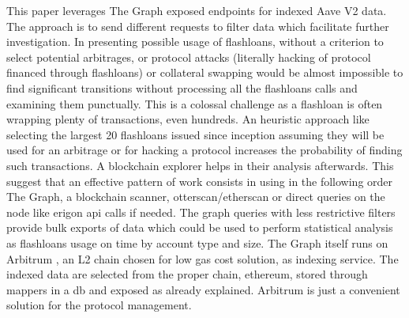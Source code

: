 \documentclass[11pt,a4paper,titlepage]{scrartcl}
\begin{document}
This paper leverages The Graph exposed endpoints for indexed Aave V2 data. The approach is to send different requests to filter data which facilitate further investigation. In presenting possible usage of flashloans, without a criterion to select potential arbitrages, or protocol attacks (literally hacking of protocol financed through flashloans) or collateral swapping would be almost impossible to find significant transitions without processing all the flashloans calls and examining them punctually. This is a colossal challenge as a flashloan is often wrapping plenty of transactions, even hundreds. An heuristic approach like selecting the largest 20 flashloans issued since inception assuming they will be used for an arbitrage or for hacking a protocol increases the probability of finding such transactions. A blockchain explorer helps in their analysis afterwards. This suggest  that an effective pattern of work consists in using in the following order The Graph, a blockchain scanner, otterscan/etherscan or direct queries on the node like erigon api calls if needed. The graph queries with less restrictive filters provide bulk exports of data which could be used to perform statistical analysis as flashloans usage on time by account type and size.
The Graph itself  runs on Arbitrum , an L2 chain chosen for low gas cost solution, as indexing service. The indexed data are selected from the proper chain, ethereum,  stored through mappers in a db and exposed as already explained. Arbitrum is just a convenient solution for the protocol management.
\end{document}
